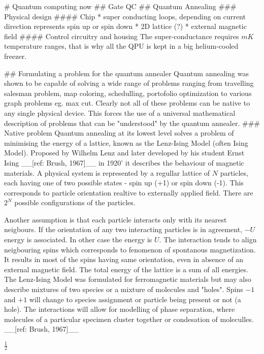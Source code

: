 # Quantum computing now
## Gate QC
## Quantum Annealing
### Physical design
#### Chip
* super conducting loops, depending on current direction represents spin up or spin down
* 2D lattice (?)
* external magnetic field
#### Control circuitry and housing
The super-conductance requires $mK$ temperature ranges, that is why all the QPU is kept in a big helium-cooled freezer.

## Formulating a problem for the quantum annealer
Quantum annealing was shown to be capable of solving a wide range of problems ranging from travelling salesman problem, map coloring, schedulling, portofolio optimization to various graph problems eg. max cut. Clearly not all of these problems can be native to any single physical device. This forces the use of a universal mathematical description of problems that can be "understood" by the quantum annealer.
### Native problem
Quantum annealing at its lowest level solves a problem of minimising the energy of a lattice, known as the Lenz-Ising Model (often Ising Model). Proposed by Wilhelm Lenz and later developed by his student Ernst Ising __[ref: Brush, 1967]__ in 1920' it describes the behaviour of magnetic materials. A physical system is represented by a regullar lattice of $N$ particles, each having one of two possible states - spin up (+1) or spin down (-1). This corresponds to particle orientation realtive to externally applied field. There are $2^N$ possible configurations of the particles.

Another assumption is that each particle interacts only with its nearest neigbours. If the orientation of any two interacting particles is in agreement, $-U$ energy is associated. In other case the energy is $U$. The interaction tends to align neigbouring spins which corresponds to fenomenon of spontanous magnetization. It results in most of the spins having same orientation, even in absence of an external magnetic field. The total energy of the lattice is a sum of all energies. The Lenz-Ising Model was formulated for ferromagnetic materials but may also describe mixtures of two species or a mixture of molecules and "holes". Spins $-1$ and $+1$ will change to species assignment or particle being present or not (a hole). The interactions will allow for modelling of phase separation, where molecules of a particular specimen cluster together or condesation of moleculles. __[ref: Brush, 1967]__




$\frac{1}{2}$